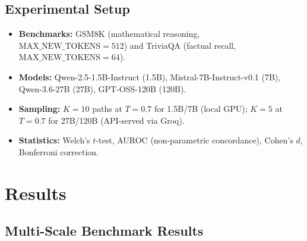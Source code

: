 \documentclass[11pt]{article}
\begin{document}
\subsection{Experimental Setup}

\begin{itemize}
    \item \textbf{Benchmarks:} GSM8K \cite{cobbe2021training} (mathematical reasoning, $\text{MAX\_NEW\_TOKENS} = 512$) and TriviaQA \cite{joshi2017triviaqa} (factual recall, $\text{MAX\_NEW\_TOKENS} = 64$).
    \item \textbf{Models:} Qwen-2.5-1.5B-Instruct (1.5B), Mistral-7B-Instruct-v0.1 (7B), Qwen-3.6-27B (27B), GPT-OSS-120B (120B).
    \item \textbf{Sampling:} $K = 10$ paths at $T = 0.7$ for 1.5B/7B (local GPU); $K = 5$ at $T = 0.7$ for 27B/120B (API-served via Groq).
    \item \textbf{Statistics:} Welch's $t$-test, AUROC (non-parametric concordance), Cohen's $d$, Bonferroni correction.
\end{itemize}

\section{Results}

\subsection{Multi-Scale Benchmark Results}
\end{document}
